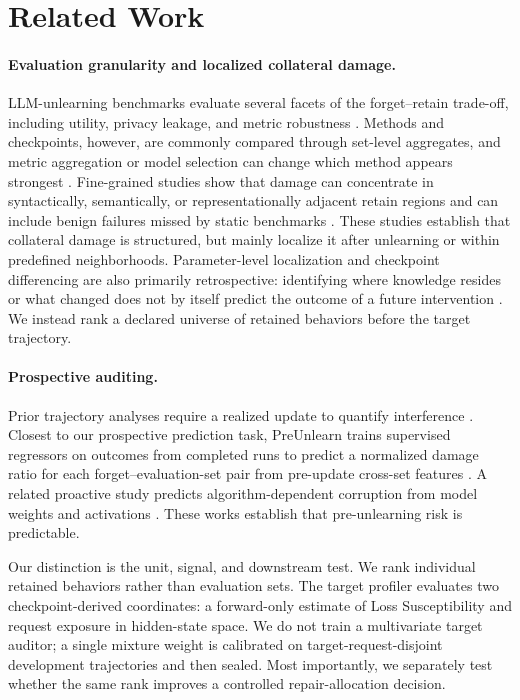\section{Related Work}
\label{sec:related}

\paragraph{Evaluation granularity and localized collateral damage.}
LLM-unlearning benchmarks evaluate several facets of the forget--retain
trade-off, including utility, privacy leakage, and metric robustness
\cite{maini2024tofu,shi2024muse,dorna2025openunlearning}. Methods and
checkpoints, however, are commonly compared through set-level aggregates, and
metric aggregation or model selection can change which method appears
strongest \cite{thaker2024position,dorna2025openunlearning}. Fine-grained
studies show that damage can concentrate in syntactically, semantically, or
representationally adjacent retain regions and can include benign failures
missed by static benchmarks
\cite{chang2025retain,cheng2026entanglement,ko2025holes}. These studies
establish that collateral damage is structured, but mainly localize it after
unlearning or within predefined neighborhoods. Parameter-level localization
and checkpoint differencing are also primarily retrospective: identifying
where knowledge resides or what changed does not by itself predict the outcome
of a future intervention
\cite{hase2023does,chang2024localization,kassem2025mneme}. We instead rank a
declared universe of retained behaviors before the target trajectory.

\paragraph{Prospective auditing.}
Prior trajectory analyses require a realized update to quantify interference
\cite{wang2025gradient}. Closest to our prospective prediction
task, PreUnlearn trains supervised regressors on outcomes from completed runs
to predict a normalized damage ratio for each forget--evaluation-set pair from
pre-update cross-set features \cite{su2026preunlearn}. A related proactive
study predicts algorithm-dependent corruption from model weights and
activations \cite{su2026corruption}. These works establish that
pre-unlearning risk is predictable.

Our distinction is the unit, signal, and downstream test. We rank individual
retained behaviors rather than evaluation sets. The target profiler evaluates
two checkpoint-derived coordinates: a forward-only estimate of Loss
Susceptibility and request exposure in hidden-state space. We do not train
a multivariate target auditor; a single
mixture weight is calibrated on target-request-disjoint development
trajectories and then sealed. Most importantly, we separately test whether the
same rank improves a controlled repair-allocation decision.


